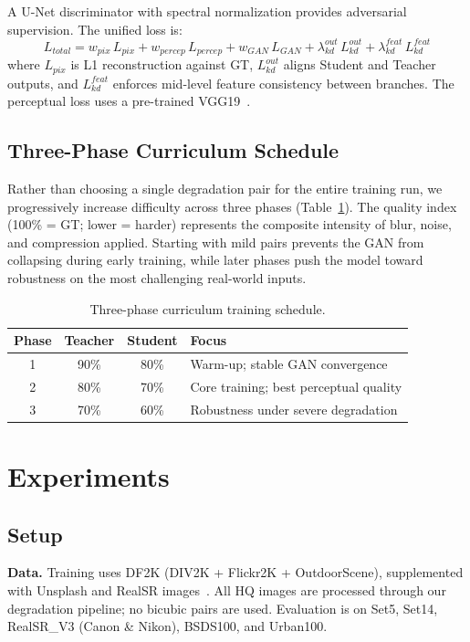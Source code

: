 \documentclass[runningheads]{llncs}
\begin{document}
A U-Net discriminator with spectral normalization provides adversarial supervision. The unified loss is:
\[
L_{total} = w_{pix}\,L_{pix} + w_{percep}\,L_{percep} + w_{GAN}\,L_{GAN} + \lambda^{out}_{kd}\,L^{out}_{kd} + \lambda^{feat}_{kd}\,L^{feat}_{kd}
\]
where $L_{pix}$ is L1 reconstruction against GT, $L^{out}_{kd}$ aligns Student and Teacher outputs, and $L^{feat}_{kd}$ enforces mid-level feature consistency between branches. The perceptual loss uses a pre-trained VGG19~\cite{simonyan2014very,johnson2016perceptual}.

\subsection{Three-Phase Curriculum Schedule}

Rather than choosing a single degradation pair for the entire training run, we progressively increase difficulty across three phases (Table~\ref{tab:curriculum}). The quality index (100\% = GT; lower = harder) represents the composite intensity of blur, noise, and compression applied. Starting with mild pairs prevents the GAN from collapsing during early training, while later phases push the model toward robustness on the most challenging real-world inputs.

\begin{table}[t]
\centering
\caption{Three-phase curriculum training schedule.}
\label{tab:curriculum}
\small
\begin{tabular}{@{}ccc p{4.2cm}@{}}
\toprule
\textbf{Phase} & \textbf{Teacher} & \textbf{Student} & \textbf{Focus} \\
\midrule
1 & 90\% & 80\% & Warm-up; stable GAN convergence \\
2 & 80\% & 70\% & Core training; best perceptual quality \\
3 & 70\% & 60\% & Robustness under severe degradation \\
\bottomrule
\end{tabular}
\end{table}


\section{Experiments}

\subsection{Setup}

\noindent\textbf{Data.} Training uses DF2K (DIV2K + Flickr2K + OutdoorScene), supplemented with Unsplash and RealSR images~\cite{11309534}. All HQ images are processed through our degradation pipeline; no bicubic pairs are used. Evaluation is on Set5, Set14, RealSR\_V3 (Canon \& Nikon), BSDS100, and Urban100.
\end{document}
